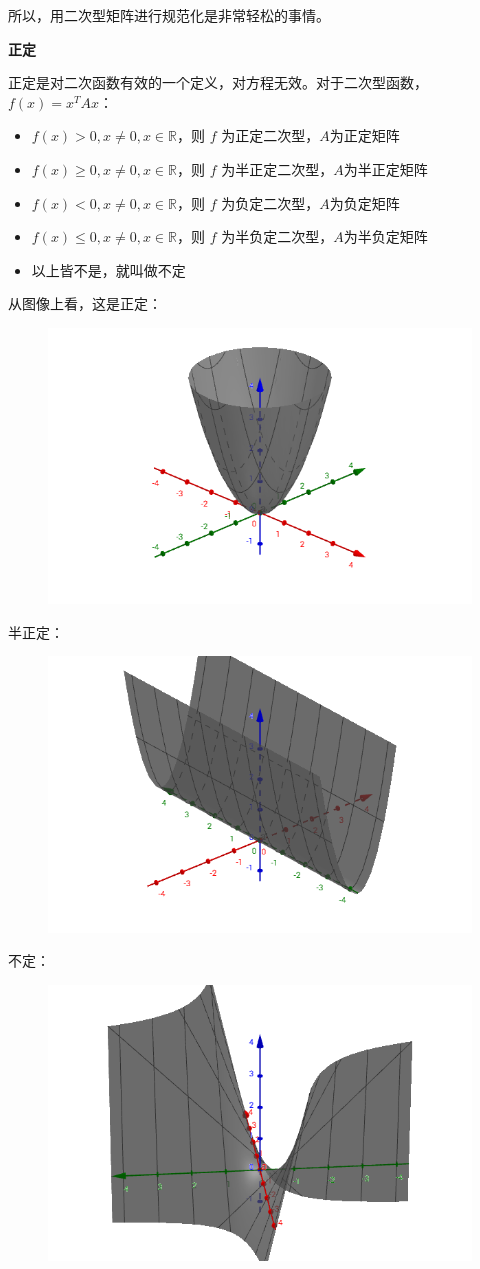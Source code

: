 \documentclass[12pt]{article}
\begin{document}
所以，用二次型矩阵进行规范化是非常轻松的事情。

\textbf{正定}

正定是对二次函数有效的一个定义，对方程无效。对于二次型函数，$f(x)=x^TAx$：
\begin{itemize}
    \item $f(x)>0, x \ne 0, x \in \mathbb{R}$，则 $f$ 为正定二次型，$A$为正定矩阵
    \item $f(x) \ge 0, x \ne 0, x \in \mathbb{R}$，则 $f$ 为半正定二次型，$A$为半正定矩阵
    \item $f(x) < 0, x \ne 0, x \in \mathbb{R}$，则 $f$ 为负定二次型，$A$为负定矩阵
    \item $f(x) \le 0, x \ne 0, x \in \mathbb{R}$，则 $f$ 为半负定二次型，$A$为半负定矩阵
    \item 以上皆不是，就叫做不定
\end{itemize}

从图像上看，这是正定：
\begin{figure}[H]
    \centering
    \includegraphics[width=.5\textwidth]{fig/UnderstandQuadraticForm_11.png}
\end{figure} 

半正定：
\begin{figure}[H]
    \centering
    \includegraphics[width=.5\textwidth]{fig/UnderstandQuadraticForm_12.png}
\end{figure} 

不定：
\begin{figure}[H]
    \centering
    \includegraphics[width=.5\textwidth]{fig/UnderstandQuadraticForm_13.png}
\end{figure} 
\end{document}
